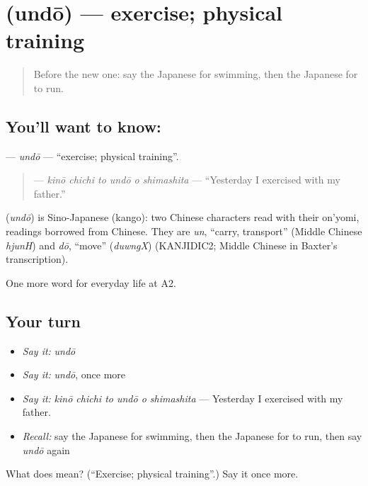 \section[\texorpdfstring{\ja{うんどう} (undō)}{うんどう (undō)}]{ (undō) — exercise; physical training}

\label{lesson:JA-C233-undou}



\begin{quote}
Before the new one: say the Japanese for swimming, then the Japanese for to run.
\end{quote}

\subsection*{You'll want to know: }
\textbf{} — \emph{undō} — \textquotedblleft{}exercise; physical training\textquotedblright{}.

\begin{quote}
\textbf{   } — \emph{kinō chichi to undō o shimashita} — \textquotedblleft{}Yesterday I exercised with my father.\textquotedblright{}
\end{quote}

\begin{cousinweb}
\textbf{} (\emph{undō}) is Sino-Japanese (kango): two Chinese characters read with their on'yomi, readings borrowed from Chinese. They are \emph{un}, \textquotedblleft{}carry, transport\textquotedblright{} (Middle Chinese \emph{hjunH}) and \emph{dō}, \textquotedblleft{}move\textquotedblright{} (\emph{duwngX}) (KANJIDIC2; Middle Chinese in Baxter's transcription).
\end{cousinweb}

\begin{grammarlens}[title={What you've built}]
One more word for everyday life at A2.
\end{grammarlens}

\subsection*{Your turn}
\begin{itemize}
\raggedright
  \item \emph{Say it:} \emph{undō}
  \item \emph{Say it:} \emph{undō}, once more
  \item \emph{Say it:} \emph{kinō chichi to undō o shimashita} — Yesterday I exercised with my father.
  \item \emph{Recall:} say the Japanese for swimming, then the Japanese for to run, then say \emph{undō} again
\end{itemize}

\begin{tcolorbox}[breakable,colback=teal!4,colframe=teal!35!black,title={Before you move on}]
What does  mean? (\textquotedblleft{}Exercise; physical training\textquotedblright{}.) Say it once more.
\end{tcolorbox}
